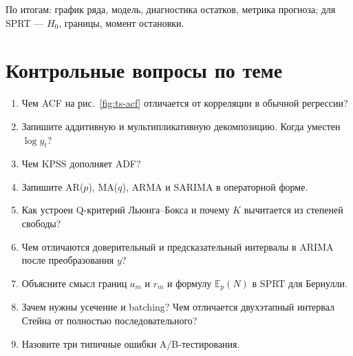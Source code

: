 По итогам: график ряда, модель, диагностика остатков, метрика прогноза; для SPRT --- $H_0$, границы, момент остановки.

\section{Контрольные вопросы по теме}

\begin{enumerate}
    \item Чем ACF на рис.~\ref{fig:ts-acf} отличается от корреляции
          в обычной регрессии?
    \item Запишите аддитивную и мультипликативную декомпозицию. Когда
          уместен $\log y_t$?
    \item Чем KPSS дополняет ADF?
    \item Запишите AR($p$), MA($q$), ARMA и SARIMA в операторной форме.
    \item Как устроен Q-критерий Льюнга--Бокса и почему $K$ вычитается
          из степеней свободы?
    \item Чем отличаются доверительный и предсказательный интервалы
          в ARIMA после преобразования $y$?
    \item Объясните смысл границ $a_m$ и $r_m$ и формулу $\mathbb{E}_p(N)$
          в SPRT для Бернулли.
    \item Зачем нужны усечение и batching? Чем отличается двухэтапный
          интервал Стейна от полностью последовательного?
    \item Назовите три типичные ошибки A/B-тестирования.
\end{enumerate}
